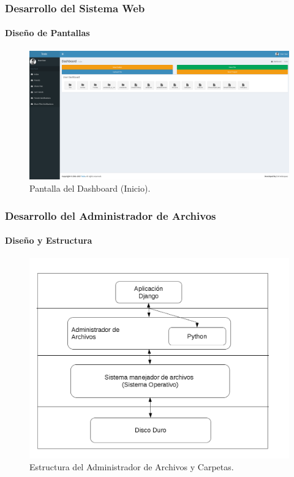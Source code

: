 \documentclass[spanish,xcolor=dvipsnames]{beamer}
\begin{document}
    \begin{frame}
    	\frametitle{Desarrollo del Sistema Web}
    	\framesubtitle{Diseño de Pantallas}
    	
    	\begin{figure}[H]
    		\centering
    		\includegraphics[scale=0.17]{img/pantallaInicio.png}
    		\caption{Pantalla del Dashboard (Inicio).}
    		\label{pantalla1}
    	\end{figure}
    	
    \end{frame}
    \begin{frame}
    	\frametitle{Desarrollo del Administrador de Archivos}
    	\framesubtitle{Diseño y Estructura}
    	
    	\begin{figure}[H]
    		\centering
    		\includegraphics[scale=0.27]{img/estructuraArchivosCarpetas.png}
    		\caption{Estructura del Administrador de Archivos y Carpetas.}
    		\label{estructuraAdministradorArchivosCarpetas}
    	\end{figure}
    	
    \end{frame}
\end{document}
